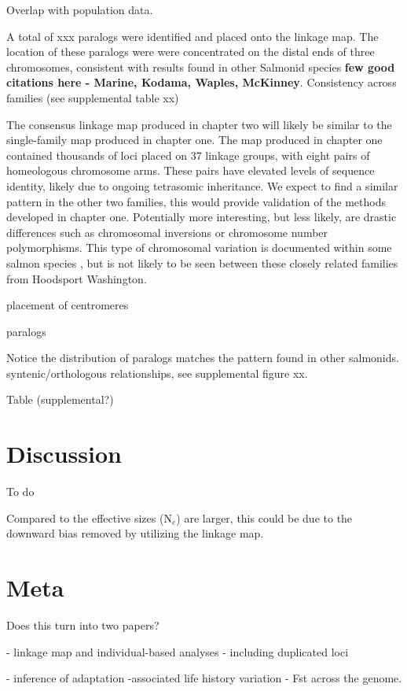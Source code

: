 \documentclass[12pt,  one column]{article}
\begin{document}
Overlap with population data.

A total of xxx paralogs were identified and placed onto the linkage map.  The location of these paralogs were were concentrated on the distal ends of three chromosomes, consistent with results found in other Salmonid species  \textbf{few good citations here - Marine, Kodama, Waples, McKinney}. Consistency across families (see supplemental table xx)

The consensus linkage map produced in chapter two will likely be similar to the single-family map produced in chapter one.  The map produced in chapter one contained thousands of loci placed on 37 linkage groups, with eight pairs of homeologous chromosome arms.  These pairs have elevated levels of sequence identity, likely due to ongoing tetrasomic inheritance.  We expect to find a similar pattern in the other two families, this would provide validation of the methods developed in chapter one. Potentially more interesting, but less likely, are drastic differences such as chromosomal inversions or chromosome number polymorphisms.  This type of chromosomal variation is documented within some salmon species \citep{Phillips2001}, but is not likely to be seen between these closely related families from Hoodsport Washington.

placement of centromeres

paralogs

Notice the distribution of paralogs matches the  pattern found in other salmonids.
syntenic/orthologous relationships, see supplemental figure xx.

Table (supplemental?)

\section*{Discussion}
To do

Compared to \citet{Small2014} the effective sizes (N$_{e}$) are larger, this could be due to the downward bias removed by utilizing the linkage map.

\section*{Meta}
Does this turn into two papers?

 - linkage map and individual-based analyses - including duplicated loci

 - inference of adaptation -associated  life history variation  - Fst across the genome.
\end{document}
